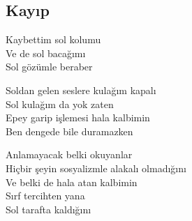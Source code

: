 \subsection{Kayıp}

Kaybettim sol kolumu \\
Ve de sol bacağımı \\
Sol gözümle beraber

\noindent\newline
Soldan gelen seslere kulağım kapalı \\
Sol kulağım da yok zaten \\
Epey garip işlemesi hala kalbimin \\
Ben dengede bile duramazken

\noindent\newline
Anlamayacak belki okuyanlar \\
Hiçbir şeyin sosyalizmle alakalı olmadığını \\
Ve belki de hala atan kalbimin \\
Sırf tercihten yana \\
Sol tarafta kaldığını